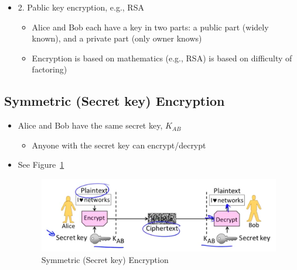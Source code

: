 \documentclass[12pt]{ctexart}   %
\begin{document}
\begin{itemize}
		\item  {\color{blue} 2.} Pablic key encryption, e.g., RSA 
		\begin{itemize}
			\item Alice and Bob each have a key in two parts: a public part (widely known), and a private part (only owner knows)
			\item Encryption is based on mathematics (e.g., RSA) is based on difficulty of factoring)
		\end{itemize}
	\end{itemize}

	\subsection{Symmetric (Secret key) Encryption}
	\begin{itemize}
		\item Alice and Bob have the same secret key, $K_{AB}$
		\begin{itemize}
			\item Anyone with the secret key can encrypt/decrypt 
		\end{itemize}
		\item See Figure~\ref{fig:10-2-4}
		  
		\begin{figure}[h!] %
		\centering
		\includegraphics[scale=0.7]{images/10-2-4}
		\caption{Symmetric (Secret key) Encryption}
		\label{fig:10-2-4}
		\end{figure}
	\end{itemize}
\end{document}
